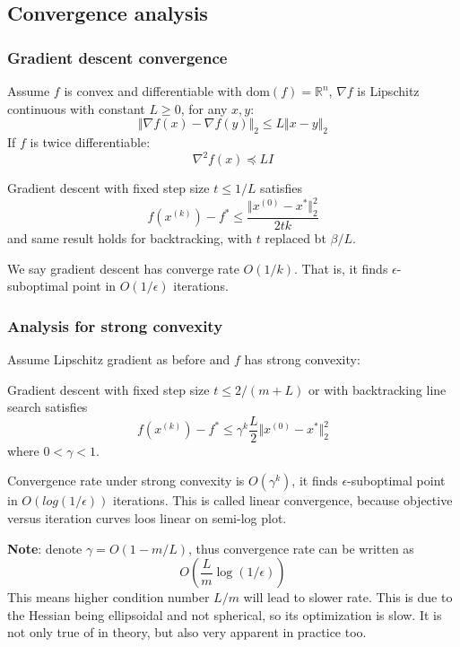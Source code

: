 \documentclass[a4paper]{article}
\begin{document}
{\subsection{Convergence analysis}
\subsubsection{Gradient descent convergence}
Assume $f$ is convex and differentiable with $\text{dom}(f)=\mathbb{R}^n$, $\nabla f $ is Lipschitz continuous with constant $L \geq 0$, for any $x, y$:
\begin{equation}
  \Vert \nabla f(x) - \nabla f(y) \Vert_2 \leq L \Vert x-y \Vert_2 \nonumber
\end{equation}
If $f$ is twice differentiable:
\begin{equation}
   \nabla^2 f(x) \preceq L I \nonumber
\end{equation}
\begin{thm}
  Gradient descent with fixed step size $t \leq 1 / L$ satisfies
  \[
  f(x^{(k)}) - f^* \leq \dfrac{\Vert x^{(0)} - x^* \Vert_2^2}{2tk}
  \]
  and same result holds for backtracking, with $t$ replaced bt $\beta/ L$.
\end{thm}
We say gradient descent has converge rate $O(1/ k)$. That is, it finds $\epsilon$-suboptimal point in $O(1/ \epsilon)$ iterations.
\subsubsection{Analysis for strong convexity}
Assume Lipschitz gradient as before and $f$ has strong convexity:
\begin{thm}
  Gradient descent with fixed step size $t \leq 2 / (m+L)$ or with backtracking line search satisfies
  \[
  f(x^{(k)}) - f^* \leq \gamma^k \dfrac{L}{2}\Vert x^{(0)} - x^* \Vert_2^2 \nonumber
  \]
  where $0 < \gamma < 1$.
\end{thm}
\noindent Convergence rate under strong convexity is $O(\gamma^k)$, it finds $\epsilon$-suboptimal point in $O(log(1/ \epsilon))$ iterations. This is called linear convergence, because objective versus iteration curves loos linear on semi-log plot.

\noindent \textbf{Note}: denote $\gamma = O(1-m / L)$, thus convergence rate can be written as 
\begin{equation}
  O(\dfrac{L}{m} \log(1 / \epsilon)) \nonumber
\end{equation}
This means higher condition number $L / m$  will lead to slower rate. This is due to the Hessian being ellipsoidal and not spherical, so its optimization is slow. It is not only true of in theory, but also very apparent in practice too.

}
\end{document}
